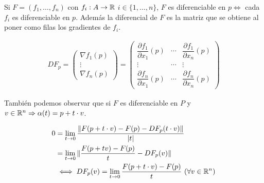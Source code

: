 Si \(F = (f_1, \ldots, f_n)\) con \(f_i: A \to \mathbb{R} \) \(i \in \{1, \ldots, n\} \), \(F\) es diferenciable en \(p \iff \) cada \(f_i\) es diferenciable en \(p\).
Además la diferencial de \(F\) es la matriz que se obtiene al poner como filas los gradientes de \(f_i\).

\begin{align*}
  DF_p = \begin{pmatrix}
           \nabla f_1(p) \\
           \vdots        \\
           \nabla f_n(p)
         \end{pmatrix} = \begin{pmatrix}
                           \dfrac{\partial f_1}{\partial x_1}(p) & \cdots & \dfrac{\partial f_1}{\partial x_n}(p) \\
                           \vdots                                & \cdots & \vdots                                \\
                           \dfrac{\partial f_n}{\partial x_1}(p) & \cdots & \dfrac{\partial f_n}{\partial x_n}(p)
                         \end{pmatrix}
\end{align*}

También podemos observar que si \(F\) es diferenciable en \(P\) y \(v \in \mathbb{R}^n \Rightarrow \alpha(t) = p + t \cdot v\).

\begin{align*}
  0 & = \lim_{t \to 0} \dfrac{\| F(p + t \cdot v) - F(p) - DF_p(t \cdot v) \|}{|t|}                 \\
    & = \lim_{t \to 0} \| \dfrac{F(p + tv) - F(p)}{t} - DF_p(v) \|                                  \\
    & \iff DF_p(v) = \lim_{t \to 0} \dfrac{F(p+t \cdot v) - F(p)}{t} \text{  } (\forall v \in \mathbb{R}^n)
\end{align*}

